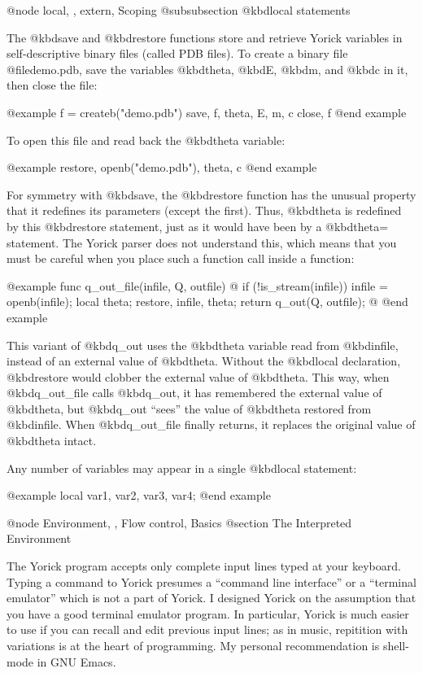 {@node local,  , extern, Scoping
@subsubsection @kbd{local} statements

The @kbd{save} and @kbd{restore} functions store and retrieve Yorick
variables in self-descriptive binary files (called PDB files).  To
create a binary file @file{demo.pdb}, save the variables @kbd{theta},
@kbd{E}, @kbd{m}, and @kbd{c} in it, then close the file:

@example
f = createb("demo.pdb")
save, f, theta, E, m, c
close, f
@end example

To open this file and read back the @kbd{theta} variable:

@example
restore, openb("demo.pdb"), theta, c
@end example

For symmetry with @kbd{save}, the @kbd{restore} function has the unusual
property that it redefines its parameters (except the first).  Thus,
@kbd{theta} is redefined by this @kbd{restore} statement, just as it
would have been by a @kbd{theta=} statement.  The Yorick parser does not
understand this, which means that you must be careful when you place
such a function call inside a function:

@example
func q_out_file(infile, Q, outfile)
@{
  if (!is_stream(infile)) infile = openb(infile);
  local theta;
  restore, infile, theta;
  return q_out(Q, outfile);
@}
@end example

This variant of @kbd{q_out} uses the @kbd{theta} variable read from
@kbd{infile}, instead of an external value of @kbd{theta}.  Without the
@kbd{local} declaration, @kbd{restore} would clobber the external value
of @kbd{theta}.  This way, when @kbd{q_out_file} calls @kbd{q_out}, it
has remembered the external value of @kbd{theta}, but @kbd{q_out}
``sees'' the value of @kbd{theta} restored from @kbd{infile}.  When
@kbd{q_out_file} finally returns, it replaces the original value of
@kbd{theta} intact.

Any number of variables may appear in a single @kbd{local} statement:

@example
local var1, var2, var3, var4;
@end example


@node Environment,  , Flow control, Basics
@section The Interpreted Environment

The Yorick program accepts only complete input lines typed at your
keyboard.  Typing a command to Yorick presumes a ``command line
interface'' or a ``terminal emulator'' which is not a part of Yorick.
I designed Yorick on the assumption that you have a good terminal
emulator program.  In particular, Yorick is much easier to use if you
can recall and edit previous input lines; as in music, repitition with
variations is at the heart of programming.  My personal recommendation
is shell-mode in GNU Emacs.

}
